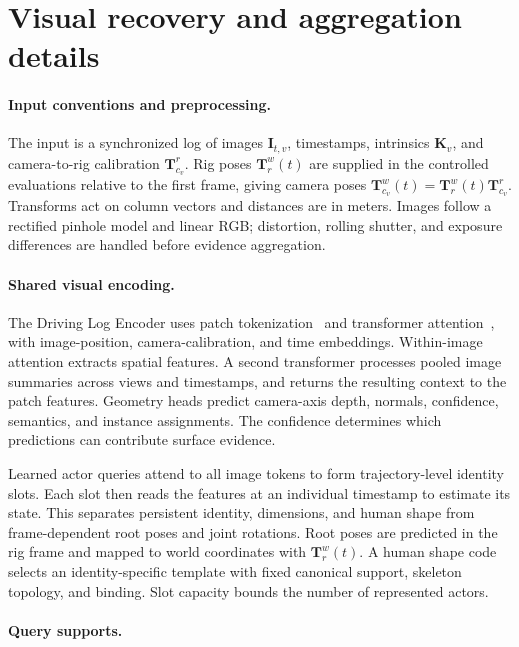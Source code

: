 \section{Visual recovery and aggregation details}
\label{sec:supp-queries}

\paragraph{Input conventions and preprocessing.}

The input is a synchronized log of images $\mathbf I_{t,v}$, timestamps, intrinsics $\mathbf K_v$, and camera-to-rig calibration $\mathbf T^r_{c_v}$. Rig poses $\mathbf T^w_r(t)$ are supplied in the controlled evaluations relative to the first frame, giving camera poses $\mathbf T^w_{c_v}(t)=\mathbf T^w_r(t)\mathbf T^r_{c_v}$. Transforms act on column vectors and distances are in meters. Images follow a rectified pinhole model and linear RGB; distortion, rolling shutter, and exposure differences are handled before evidence aggregation.

\paragraph{Shared visual encoding.}

The Driving Log Encoder uses patch tokenization~\cite{dosovitskiy2021vit} and transformer attention~\cite{vaswani2017attention}, with image-position, camera-calibration, and time embeddings. Within-image attention extracts spatial features. A second transformer processes pooled image summaries across views and timestamps, and returns the resulting context to the patch features. Geometry heads predict camera-axis depth, normals, confidence, semantics, and instance assignments. The confidence determines which predictions can contribute surface evidence.

Learned actor queries attend to all image tokens to form trajectory-level identity slots. Each slot then reads the features at an individual timestamp to estimate its state. This separates persistent identity, dimensions, and human shape from frame-dependent root poses and joint rotations. Root poses are predicted in the rig frame and mapped to world coordinates with $\mathbf T^w_r(t)$. A human shape code selects an identity-specific template with fixed canonical support, skeleton topology, and binding. Slot capacity bounds the number of represented actors.

\paragraph{Query supports.}

